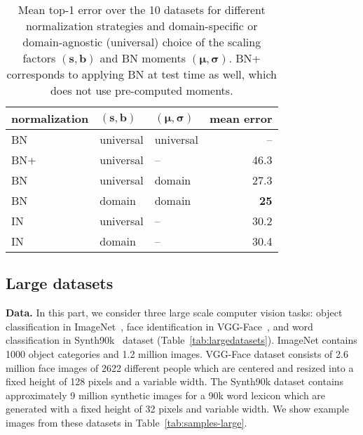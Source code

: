 \documentclass[10pt,twocolumn,letterpaper]{article}
\renewcommand{\paragraph}[1]{\par\medskip\noindent\textbf{#1}}
\begin{document}
\begin{table}
	\centering
	\begin{tabular}{lllr}
		\toprule
		normalization & $(\bm s,\bm b)$ & $(\bm\mu,\bm\sigma)$ & mean error\\
		\midrule
		BN         & universal & universal & --   \\
		BN+        & universal & --        & 46.3 \\
	    BN         & universal & domain    & 27.3 \\ 
		BN         & domain    & domain    & \bf{25} \\
		IN         & universal & --        & 30.2 \\
	    IN         & domain    & --        & 30.4 \\
	    \bottomrule
	\end{tabular}
	\caption{Mean top-1 error over the 10 datasets for different normalization strategies and domain-specific or domain-agnostic (universal) choice of the scaling factors $(\bm s,\bm b)$ and BN moments $(\bm\mu,\bm\sigma)$. BN+ corresponds to applying BN at test time as well, which does not use pre-computed moments.}
	\label{tab:norm}
\end{table} 
\subsection{Large datasets}\label{s:large-data}

\paragraph{Data.} In this part, we consider three large scale computer vision tasks: object classification in ImageNet~\cite{russakovsky14imagenet}, face identification in VGG-Face~\cite{parkhi15deep}, and word classification in Synth90k~\cite{jaderberg14synthetic} dataset (Table~\ref{tab:largedatasets}). ImageNet contains 1000 object categories and 1.2 million images. VGG-Face dataset consists of 2.6 million face images of 2622 different people which are centered and resized into a fixed height of 128 pixels and a variable width. The Synth90k dataset contains approximately 9 million synthetic images for a 90k word lexicon which are generated with a fixed height of 32 pixels and variable width. We show example images from these datasets in Table~\ref{tab:samples-large}.
\end{document}
